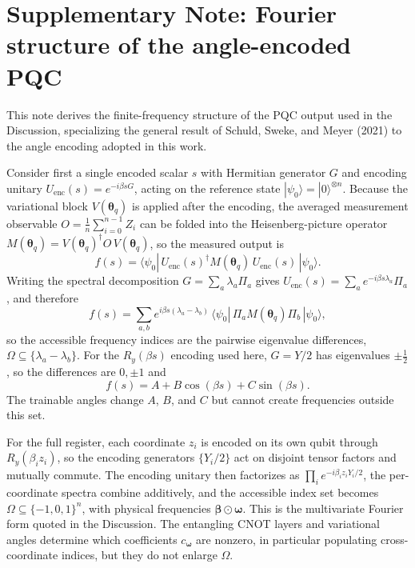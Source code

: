 \documentclass[11pt,a4paper]{article}
\begin{document}
\section*{Supplementary Note: Fourier structure of the angle-encoded PQC}

This note derives the finite-frequency structure of the PQC output used in the Discussion, specializing the general result of Schuld, Sweke, and Meyer (2021) to the angle encoding adopted in this work.

Consider first a single encoded scalar $s$ with Hermitian generator $G$ and encoding unitary $U_{\mathrm{enc}}(s)=e^{-i\beta s G}$, acting on the reference state $|\psi_0\rangle=|0\rangle^{\otimes n}$. Because the variational block $V(\boldsymbol{\theta}_q)$ is applied after the encoding, the averaged measurement observable $O=\frac{1}{n}\sum_{i=0}^{n-1}Z_i$ can be folded into the Heisenberg-picture operator $M(\boldsymbol{\theta}_q)=V(\boldsymbol{\theta}_q)^\dagger O\,V(\boldsymbol{\theta}_q)$, so the measured output is
\begin{equation}
  f(s)=\langle\psi_0|\,U_{\mathrm{enc}}(s)^\dagger M(\boldsymbol{\theta}_q)\,U_{\mathrm{enc}}(s)\,|\psi_0\rangle.
\end{equation}
Writing the spectral decomposition $G=\sum_a \lambda_a \Pi_a$ gives $U_{\mathrm{enc}}(s)=\sum_a e^{-i\beta s\lambda_a}\Pi_a$, and therefore
\begin{equation}
  f(s)=\sum_{a,b} e^{i\beta s(\lambda_a-\lambda_b)}\,\langle\psi_0|\,\Pi_a M(\boldsymbol{\theta}_q)\Pi_b\,|\psi_0\rangle,
\end{equation}
so the accessible frequency indices are the pairwise eigenvalue differences, $\Omega\subseteq\{\lambda_a-\lambda_b\}$. For the $R_y(\beta s)$ encoding used here, $G=Y/2$ has eigenvalues $\pm\tfrac{1}{2}$, so the differences are $0,\pm 1$ and
\begin{equation}
  f(s)=A+B\cos(\beta s)+C\sin(\beta s).
\end{equation}
The trainable angles change $A$, $B$, and $C$ but cannot create frequencies outside this set.

For the full register, each coordinate $z_i$ is encoded on its own qubit through $R_y(\beta_i z_i)$, so the encoding generators $\{Y_i/2\}$ act on disjoint tensor factors and mutually commute. The encoding unitary then factorizes as $\prod_i e^{-i\beta_i z_i Y_i/2}$, the per-coordinate spectra combine additively, and the accessible index set becomes $\Omega\subseteq\{-1,0,1\}^n$, with physical frequencies $\boldsymbol{\beta}\odot\boldsymbol{\omega}$. This is the multivariate Fourier form quoted in the Discussion. The entangling CNOT layers and variational angles determine which coefficients $c_{\boldsymbol{\omega}}$ are nonzero, in particular populating cross-coordinate indices, but they do not enlarge $\Omega$.
\end{document}
